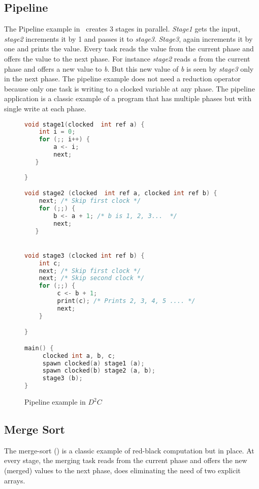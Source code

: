 \documentclass[10pt, conference, compsocconf]{IEEEtran}
\begin{document}
\subsection{Pipeline}
The Pipeline example in~
 creates 3 stages in parallel. \emph{Stage1} gets the input,
\emph{stage2} increments it by 1 and passes it to \emph{stage3}. 
\emph{Stage3}, again increments it by one and prints the value. Every task reads the value
from the current phase and offers the value to the next phase. 
For instance \emph{stage2} reads \emph{a} from the current phase 
and offers a new value to \emph{b}. But this new value of \emph{b} is seen by \emph{stage3} only 
in the next phase. The pipeline example does not need a reduction operator
because only one task is writing to a clocked variable at any phase. The pipeline application is a classic example
 of a program that has multiple phases but with single write at each phase.


\begin{figure}[htbp]
\begin{lstlisting}[language=C]
void stage1(clocked  int ref a) {
    int i = 0;
    for (;; i++) {
        a <- i;
        next;
   }
      
}

void stage2 (clocked  int ref a, clocked int ref b) {
    next; /* Skip first clock */
    for (;;) {
        b <- a + 1; /* b is 1, 2, 3...  */ 
        next;
   }


void stage3 (clocked int ref b) {
    int c;
    next; /* Skip first clock */
    next; /* Skip second clock */
    for (;;) {
         c <- b + 1;
         print(c); /* Prints 2, 3, 4, 5 .... */
         next; 
    }

}

main() {
     clocked int a, b, c; 
     spawn clocked(a) stage1 (a);
     spawn clocked(b) stage2 (a, b);
     stage3 (b);
}
\end{lstlisting}
\caption{Pipeline example in $D^2C$}
\label{fig:pipeline}
\end{figure}


\subsection{Merge Sort}
\label{sec:mergesort}

The merge-sort () is a classic example of red-black computation
but in place.
At every stage, the merging task reads from the current phase
and offers the new (merged) values to the next phase, does
eliminating the need of two explicit arrays.
\end{document}
